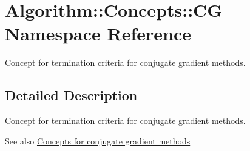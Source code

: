 \hypertarget{namespaceAlgorithm_1_1Concepts_1_1CG}{}\section{Algorithm\+:\+:Concepts\+:\+:C\+G Namespace Reference}
\label{namespaceAlgorithm_1_1Concepts_1_1CG}


Concept for termination criteria for conjugate gradient methods.  




\subsection{Detailed Description}
Concept for termination criteria for conjugate gradient methods. 

\begin{DoxySeeAlso}{See also}
\hyperlink{group__CGConceptGroup}{Concepts for conjugate gradient methods} 
\end{DoxySeeAlso}
